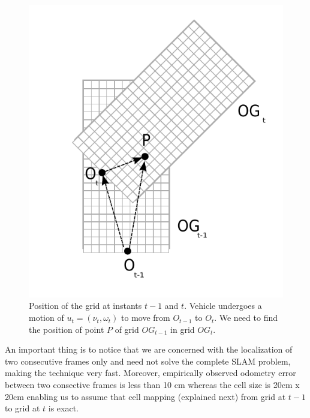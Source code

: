 \begin{figure}[h]
\begin{center}
\includegraphics[scale=0.8]{img/fig:translation}
\caption{Position of the grid at instants $t-1$ and $t$. Vehicle undergoes a motion of $u_t=(\nu_t, \omega_t)$ to move from $O_{t-1}$ to $O_t$. We need to find the position of point $P$ of grid $OG_{t-1}$ in grid $OG_t$.}
\label{fig:gridmove}
\end{center}
\end{figure}

An important thing is to notice that we are concerned with the localization of two consecutive frames only
and need not solve the complete SLAM problem, making the technique very fast. Moreover, empirically observed odometry error between two consective frames is less than 10 cm whereas the cell size is 20cm x 20cm
enabling us to assume that cell mapping (explained next) from grid at $t-1$ to grid at $t$ is exact.

